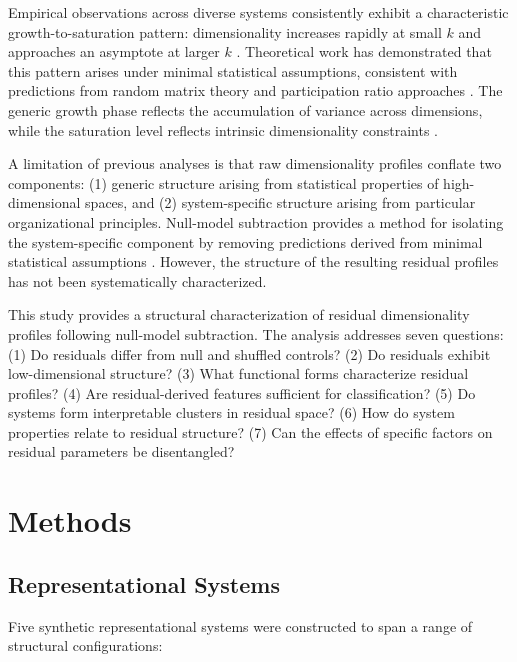 Empirical observations across diverse systems consistently exhibit a characteristic growth-to-saturation pattern: dimensionality increases rapidly at small $k$ and approaches an asymptote at larger $k$ \citep{travesset2022extended, stringer2019high}. Theoretical work has demonstrated that this pattern arises under minimal statistical assumptions, consistent with predictions from random matrix theory \citep{marchenko1967distribution, couillet2011random} and participation ratio approaches \citep{penzel2022spectral}. The generic growth phase reflects the accumulation of variance across dimensions, while the saturation level reflects intrinsic dimensionality constraints \citep{jolliffe2002principal}.

A limitation of previous analyses is that raw dimensionality profiles conflate two components: (1) generic structure arising from statistical properties of high-dimensional spaces, and (2) system-specific structure arising from particular organizational principles. Null-model subtraction provides a method for isolating the system-specific component by removing predictions derived from minimal statistical assumptions \citep{paper3, paper4}. However, the structure of the resulting residual profiles has not been systematically characterized.

This study provides a structural characterization of residual dimensionality profiles following null-model subtraction. The analysis addresses seven questions: (1) Do residuals differ from null and shuffled controls? (2) Do residuals exhibit low-dimensional structure? (3) What functional forms characterize residual profiles? (4) Are residual-derived features sufficient for classification? (5) Do systems form interpretable clusters in residual space? (6) How do system properties relate to residual structure? (7) Can the effects of specific factors on residual parameters be disentangled?

\section{Methods}

\subsection{Representational Systems}

Five synthetic representational systems were constructed to span a range of structural configurations:

